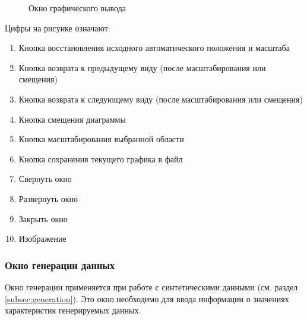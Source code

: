 \documentclass[12pt,tikz]{instruction}
\begin{document}
\begin{figure}[H]
	\centering
	\caption{Окно графического вывода}
	\label{fig:plot-view}
\end{figure}


Цифры на рисунке означают:
\begin{enumerate}
	\item Кнопка восстановления исходного автоматического положения и масштаба
	\item Кнопка возврата к предыдущему виду (после масштабирования или смещения)
	\item Кнопка возврата к следующему виду (после масштабирования или смещения)
	\item Кнопка смещения диаграммы
	\item Кнопка масштабирования выбранной области
	\item Кнопка сохранения текущего графика в файл
	\item Свернуть окно
	\item Развернуть окно
	\item Закрыть окно 
	\item Изображение
\end{enumerate}

\subsubsection{Окно генерации данных}
Окно генерации применяется при работе с синтетическими данными (см. раздел \ref{subsec:generation}). Это окно необходимо для ввода информации о значениях характеристик генерируемых данных.
\end{document}
